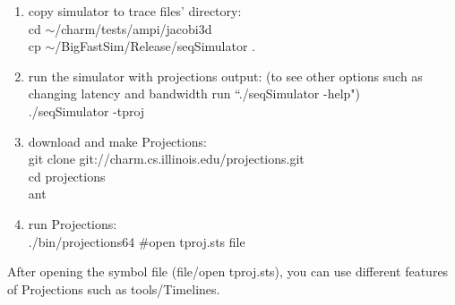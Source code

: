 \begin{enumerate}
\item copy simulator to trace files' directory:\\
        cd $\sim$/charm/tests/ampi/jacobi3d\\
        cp $\sim$/BigFastSim/Release/seqSimulator .\\

\item run the simulator with projections output: (to see other options such as changing latency and bandwidth run ``./seqSimulator -help")\\
        ./seqSimulator -tproj\\

\item download and make Projections:\\
        git clone git://charm.cs.illinois.edu/projections.git\\
        cd projections\\
        ant\\

\item run Projections:\\
        ./bin/projections64 \#open tproj.sts file\\

\end{enumerate}

After opening the symbol file (file/open tproj.sts), you can use different features of Projections such as tools/Timelines.
